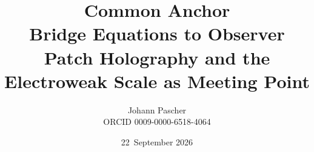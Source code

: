 \documentclass[11pt,a4paper]{report}
\title{Common Anchor\\[0.5em]\large Bridge Equations to Observer Patch Holography and the Electroweak Scale as Meeting Point}
\date{22~September 2026}
\author{Johann Pascher\\\small ORCID 0009-0000-6518-4064}
\begin{document}
\renewcommand{\thechapter}{}
\renewcommand{\thesection}{\arabic{section}}
\maketitle
\tableofcontents

\end{document}
